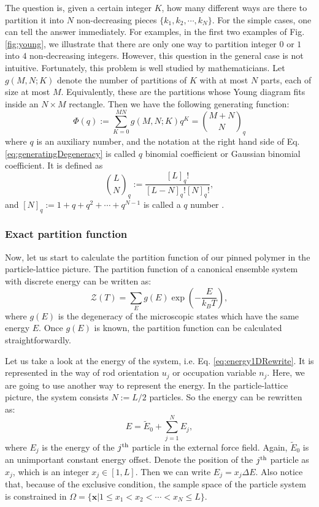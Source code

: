 The question is, given a certain integer $K$, how many different ways are there to partition it into $N$ non-decreasing pieces $\{k_1, k_2, \cdots, k_N\}$. For the simple cases, one can tell the answer immediately. For examples, in the first two examples of Fig. \ref{fig:young}, we illustrate that there are only one way to partition integer $0$ or $1$ into $4$ non-decreasing integers. However, this question in the general case is not intuitive. Fortunately, this problem is well studied by mathematicians. Let $g(M, N; K)$ denote the number of partitions of $K$ with at most $N$ parts, each of size at most $M$. Equivalently, these are the partitions whose Young diagram fits inside an $N \times M$ rectangle. Then we have the following generating function:
\begin{equation}
    \label{eq:generatingDegeneracy}
    \Phi(q):=\sum_{K=0}^{MN} g(M, N; K) q^K = \binom{M+N}{N}_q
\end{equation}
where $q$ is an auxiliary number, and the notation at the right hand side of Eq. \eqref{eq:generatingDegeneracy} is called $q$ binomial coefficient or Gaussian binomial coefficient. It is defined as 
\begin{equation}
    \label{eq:qBinomial}
    \binom{L}{N}_q := \frac{[L]_q!}{[L-N]_q![N]_q!},
\end{equation}
and $[N]_q := 1 + q + q^2 + \cdots + q^{N-1}$ is called a $q$ number \cite{Andrews1998}.


\subsubsection{Exact partition function}
\label{ssub:Exact Partition Function}
Now, let us start to calculate the partition function of our pinned polymer in the particle-lattice picture. The partition function of a canonical ensemble system with discrete energy can be written as:
\begin{equation}
    \label{eq:partitionFuncCanonical}
    \mathcal{Z}\left(T\right) = \sum_{E}g(E)\exp \left(-\frac{E}{k_B T}\right),
\end{equation}
where $g(E)$ is the degeneracy of the microscopic states which have the same energy $E$. Once $g(E)$ is known, the partition function can be calculated straightforwardly.

Let us take a look at the energy of the system, i.e. Eq. \eqref{eq:energy1DRewrite}. It is represented in the way of rod orientation $u_j$ or occupation variable $n_j$. Here, we are going to use another way to represent the energy. In the particle-lattice picture, the system consists $N:=L/2$ particles. So the energy can be rewritten as:
\begin{equation}
    E = \tilde{E}_0 + \sum_{j=1}^N E_j,
\end{equation}
where $E_j$ is the energy of the $j^{\rm{th}}$ particle in the external force field. Again, $\tilde{E}_0$ is an unimportant constant energy offset. Denote the position of the $j^{\rm{th}}$ particle as $x_j$, which is an integer $x_j\in[1, L]$. Then we can write $E_j = x_j \Delta E$. 
Also notice that, because of the exclusive condition, the sample space of the particle system is constrained in $\Omega = \{\mathbf{x}| 1\leqslant x_1<x_2<\cdots<x_N\leqslant L\}$.

